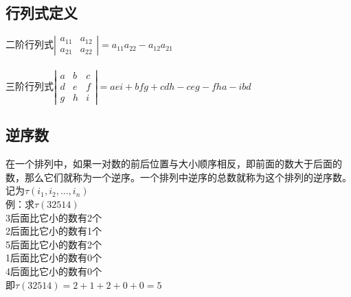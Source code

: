 \documentclass{article}
\begin{document}
\begin{flushleft}
	\LARGE
	
	\newcommand{\udots}{\mathinner{\mskip1mu\raise1pt\vbox{\kern7pt\hbox{.}}  
			\mskip2mu\raise4pt\hbox{.}\mskip2mu\raise7pt\hbox{.}\mskip1mu}} 

	\section{行列式定义}
	二阶行列式$\left|\begin{array}{cccc} 
	a_{11}&a_{12}\\ 
	a_{21}&a_{22}
	\end{array}\right|=a_{11}a_{22}-a_{12}a_{21}$\\
	~\\
	三阶行列式$\left|\begin{array}{cccc} 
	a&b&c\\ 
	d&e&f\\
	g&h&i
	\end{array}\right|=aei+bfg+cdh-ceg-fha-ibd$\\

	\subsection{逆序数}
	在一个排列中，如果一对数的前后位置与大小顺序相反，即前面的数大于后面的数，那么它们就称为一个逆序。一个排列中逆序的总数就称为这个排列的逆序数。记为$\tau(i_1,i_2,...,i_n)$\\
	例：求$\tau(32514)$\\
	\qquad 3后面比它小的数有2个\\
	\qquad 2后面比它小的数有1个\\
	\qquad 5后面比它小的数有2个\\
	\qquad 1后面比它小的数有0个\\
	\qquad 4后面比它小的数有0个\\
	\qquad 即$\tau(32514)=2+1+2+0+0=5$\\
	

\end{flushleft}
\end{document}

